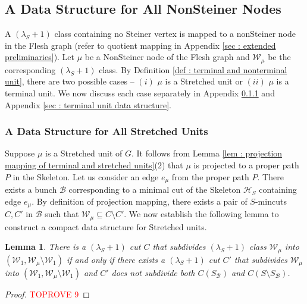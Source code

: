 \documentclass[letterpaper,11pt]{article}
\newtheorem{lemma}{Lemma}[]
\begin{document}
\subsection{A Data Structure for All NonSteiner Nodes}
A $(\lambda_S+1)$ class containing no Steiner vertex is mapped to a nonSteiner node in the Flesh graph (refer to quotient mapping in Appendix \ref{sec : extended preliminaries}). Let $\mu$ be a NonSteiner node of the Flesh graph and ${\mathcal W}_{\mu}$ be the corresponding $(\lambda_S+1)$ class. By Definition \ref{def : terminal and nonterminal unit}, there are two possible cases -- $(i)$ $\mu$ is a Stretched unit or $(ii)$ $\mu$ is a terminal unit. We now discuss each case separately in Appendix \ref{sec : stretched unit data structure} and Appendix \ref{sec : terminal unit data structure}. 
\subsubsection{A Data Structure for All Stretched Units} \label{sec : stretched unit data structure}
 Suppose $\mu$ is a Stretched unit of $G$. It follows from Lemma \ref{lem : projection mapping of terminal and stretched units}(2) that $\mu$ is projected to a proper path $P$ in the Skeleton. Let us consider an edge $e_{\mu}$ from the proper path $P$. There exists a bunch ${\mathcal B}$ corresponding to a minimal cut of the Skeleton ${\mathcal H}_S$ containing edge $e_{\mu}$. By definition of projection mapping, there exists a pair of $S$-mincuts $C,C'$ in ${\mathcal B}$ such that ${\mathcal W}_{\mu}\subseteq C\setminus C'$. We now establish the following lemma to construct a compact data structure for Stretched units.
\begin{lemma} \label{lem : cuts are stored}
    There is a $(\lambda_S+1)$ cut $C$ that subdivides $(\lambda_S+1)$ class ${\mathcal W}_{\mu}$ into $({\mathcal W}_1,{\mathcal W}_{\mu}\setminus {\mathcal W}_1)$ if and only if there exists a $(\lambda_S+1)$ cut $C'$ that subdivides ${\mathcal W}_{\mu}$ into $({\mathcal W}_1,{\mathcal W}_{\mu}\setminus {\mathcal W}_1)$ and $C'$ does not subdivide both $C(S_{\mathcal B})$ and $C(S\setminus S_{\mathcal B})$.
\end{lemma}
\begin{proof}\textcolor{red}{TOPROVE 9}\end{proof} 
\end{document}
